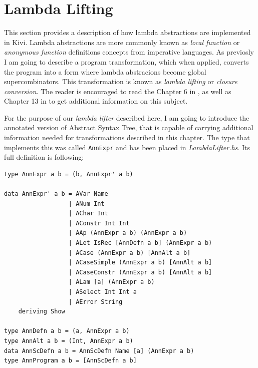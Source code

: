 \documentclass[12pt,a4paper]{report}
\begin{document}

\section{Lambda Lifting}
\label{sec:lambda_lifting}
This section provides a description of how lambda abstractions are implemented
in Kivi. Lambda abstractions are more commonly known as \textit{local function}
or \textit{anonymous function} definitions concepts from imperative languages.
As previosly I am going to describe a program transformation, which when
applied, converts the program into a form where lambda abstracions become
global supercombinators. This transformation is known as \textit{lambda
lifting} or \textit{closure conversion}. The reader is encouraged to read the
Chapter 6 in \cite{JonLes00}, as well as Chapter 13 in \cite{Jon87} to
get additional information on this subject.

For the purpose of our \textit{lambda lifter} described here, I am going to
introduce the annotated version of Abstract Syntax Tree, that is capable of
carrying additional information needed for transformations described in this
chapter. The type that implements this was called \texttt{AnnExpr} and has
been placed in \textit{LambdaLifter.hs}. Its full definition is following:

\vspace*{0.2in}
\begin{lstlisting}[style=haskell,label=lst:annotated_expression]
type AnnExpr a b = (b, AnnExpr' a b)

data AnnExpr' a b = AVar Name
                  | ANum Int
                  | AChar Int
                  | AConstr Int Int
                  | AAp (AnnExpr a b) (AnnExpr a b)
                  | ALet IsRec [AnnDefn a b] (AnnExpr a b)
                  | ACase (AnnExpr a b) [AnnAlt a b]
                  | ACaseSimple (AnnExpr a b) [AnnAlt a b]
                  | ACaseConstr (AnnExpr a b) [AnnAlt a b]
                  | ALam [a] (AnnExpr a b)
                  | ASelect Int Int a
                  | AError String
    deriving Show

type AnnDefn a b = (a, AnnExpr a b)
type AnnAlt a b = (Int, AnnExpr a b)
data AnnScDefn a b = AnnScDefn Name [a] (AnnExpr a b)
type AnnProgram a b = [AnnScDefn a b]
\end{lstlisting}
\end{document}
